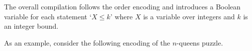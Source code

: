 The overall compilation follows the order encoding \cite{tatakiba09a,bageinscsotawe13a} and
introduces a Boolean variable for each statement `$X\leq k$' where $X$ is a variable over integers and $k$ is an integer bound.

As an example,
consider the following encoding of the $n$-queens puzzle.



